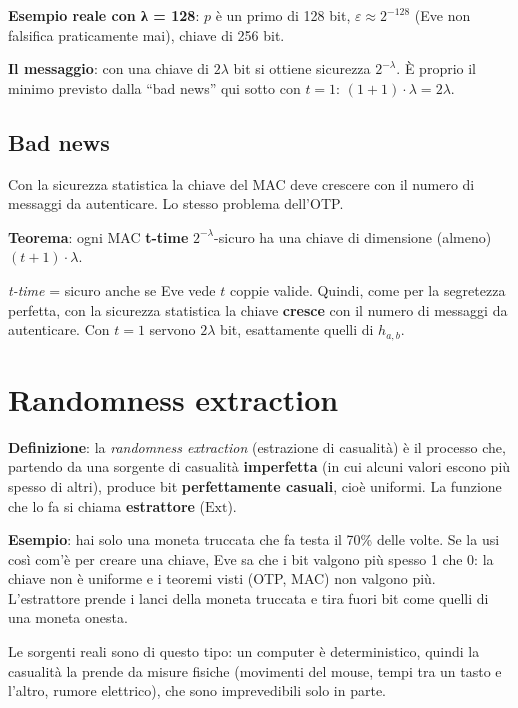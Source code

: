 \begin{esempio}

\textbf{Esempio reale con λ = 128}: \(p\) è un primo di 128 bit, \(\varepsilon \approx 2^{-128}\) (Eve non falsifica praticamente mai), chiave di 256 bit.

\end{esempio}

\textbf{Il messaggio}: con una chiave di \(2\lambda\) bit si ottiene sicurezza \(2^{-\lambda}\). È proprio il minimo previsto dalla ``bad news'' qui sotto con \(t = 1\): \((1 + 1) \cdot \lambda = 2\lambda\).

\subsection{Bad news}

\begin{inbreve}

Con la sicurezza statistica la chiave del MAC deve crescere con il numero di messaggi da autenticare. Lo stesso problema dell'OTP.

\end{inbreve}

\textbf{Teorema}: ogni MAC \textbf{t-time} \(2^{-\lambda}\)-sicuro ha una chiave di dimensione (almeno) \((t+1) \cdot \lambda\).

\emph{t-time} = sicuro anche se Eve vede \(t\) coppie valide. Quindi, come per la segretezza perfetta, con la sicurezza statistica la chiave \textbf{cresce} con il numero di messaggi da autenticare. Con \(t = 1\) servono \(2\lambda\) bit, esattamente quelli di \(h_{a,b}\).

\section{Randomness extraction}

\textbf{Definizione}: la \emph{randomness extraction} (estrazione di casualità) è il processo che, partendo da una sorgente di casualità \textbf{imperfetta} (in cui alcuni valori escono più spesso di altri), produce bit \textbf{perfettamente casuali}, cioè uniformi. La funzione che lo fa si chiama \textbf{estrattore} (\(\text{Ext}\)).

\begin{esempio}

\textbf{Esempio}: hai solo una moneta truccata che fa testa il 70\% delle volte. Se la usi così com'è per creare una chiave, Eve sa che i bit valgono più spesso 1 che 0: la chiave non è uniforme e i teoremi visti (OTP, MAC) non valgono più. L'estrattore prende i lanci della moneta truccata e tira fuori bit come quelli di una moneta onesta.

Le sorgenti reali sono di questo tipo: un computer è deterministico, quindi la casualità la prende da misure fisiche (movimenti del mouse, tempi tra un tasto e l'altro, rumore elettrico), che sono imprevedibili solo in parte.

\end{esempio}

